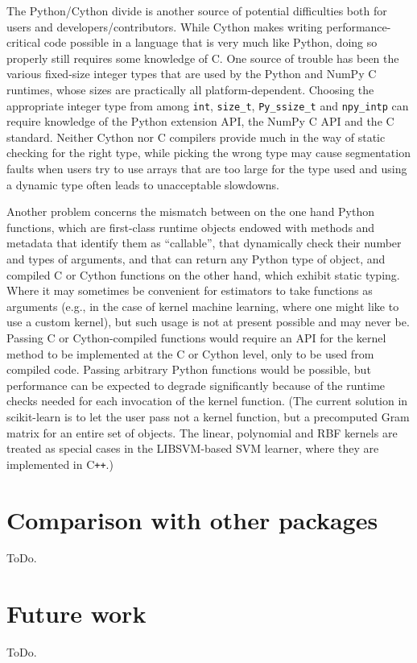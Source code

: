 \documentclass[a4paper,twocolumn]{article}
\DeclareRobustCommand{\VAN}[3]{#2}
\begin{document}
The Python/Cython divide is another source of potential difficulties
both for users and developers/contributors.
While Cython makes writing performance-critical code possible
in a language that is very much like Python,
doing so properly still requires some knowledge of C.
One source of trouble has been the various fixed-size integer types
that are used by the Python and NumPy C runtimes,
whose sizes are practically all platform-dependent.
Choosing the appropriate integer type from among
\texttt{int}, \texttt{size\_t}, \texttt{Py\_ssize\_t} and \texttt{npy\_intp}
can require knowledge of the Python extension API,
the NumPy C API and the C standard.
Neither Cython nor C compilers provide much in the way of static checking
for the right type,
while picking the wrong type may cause segmentation faults
when users try to use arrays that are too large for the type used
and using a dynamic type often leads to unacceptable slowdowns.

Another problem concerns the mismatch between on the one hand Python functions,
which are first-class runtime objects endowed with methods and metadata
that identify them as ``callable'',
that dynamically check their number and types of arguments,
and that can return any Python type of object,
and compiled C or Cython functions on the other hand,
which exhibit static typing.
Where it may sometimes be convenient for estimators
to take functions as arguments
(e.g., in the case of kernel machine learning,
where one might like to use a custom kernel),
but such usage is not at present possible and may never be.
Passing C or Cython-compiled functions would require an API
for the kernel method to be implemented at the C or Cython level,
only to be used from compiled code.
Passing arbitrary Python functions would be possible,
but performance can be expected to degrade significantly
because of the runtime checks needed for each invocation of the kernel function.
(The current solution in scikit-learn is to let the user pass
not a kernel function, but a precomputed Gram matrix
for an entire set of objects.
The linear, polynomial and RBF kernels are treated as special cases in
the \textsf{LIBSVM}-based SVM learner,
where they are implemented in C{}\verb!++!.)

\section{Comparison with other packages}

ToDo.

\section{Future work}

ToDo.


\DeclareRobustCommand{\VAN}[3]{#3}

\end{document}
